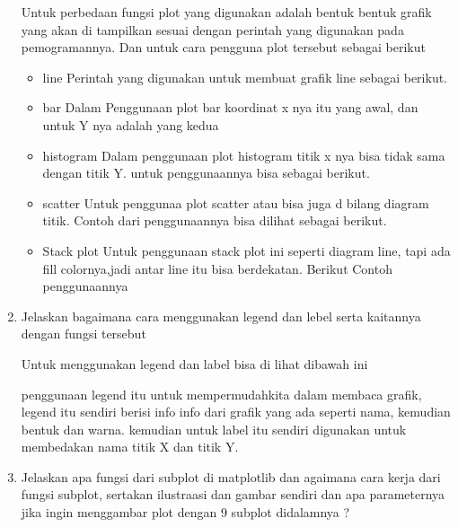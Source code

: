\documentclass[10pt]{article}
\begin{document}
\begin{enumerate}
Untuk perbedaan fungsi plot yang digunakan adalah bentuk bentuk grafik yang akan di tampilkan sesuai dengan perintah yang digunakan pada pemogramannya.
Dan untuk cara pengguna plot tersebut sebagai berikut
\begin{itemize}
    \item line
    Perintah yang digunakan untuk membuat grafik line sebagai berikut.
    
    \item bar
    Dalam Penggunaan plot bar koordinat x nya itu yang awal, dan untuk Y nya adalah yang kedua
    
    \item histogram
    Dalam penggunaan plot histogram titik x nya bisa tidak sama dengan titik Y.
    untuk penggunaannya bisa sebagai berikut.
    
    \item scatter
    Untuk penggunaa plot scatter atau bisa juga d bilang diagram titik.
    Contoh dari penggunaannya bisa dilihat sebagai berikut.
    
    \item Stack plot
    Untuk penggunaan stack plot ini seperti diagram line, tapi ada fill colornya,jadi antar line itu bisa berdekatan.
    Berikut Contoh penggunaannya
    
\end{itemize} 
\item Jelaskan bagaimana cara menggunakan legend dan lebel serta kaitannya dengan fungsi tersebut 

Untuk menggunakan legend dan label bisa di lihat dibawah ini

penggunaan legend itu untuk mempermudahkita dalam membaca grafik, legend itu sendiri berisi info info dari grafik yang ada seperti nama, kemudian bentuk dan warna.
kemudian untuk label itu sendiri digunakan untuk membedakan nama titik X dan titik Y.

\item Jelaskan apa fungsi dari subplot di matplotlib dan agaimana cara kerja dari fungsi subplot, sertakan ilustraasi dan gambar sendiri dan apa parameternya jika ingin menggambar plot dengan 9 subplot didalamnya ? 


\end{enumerate}
\end{document}
